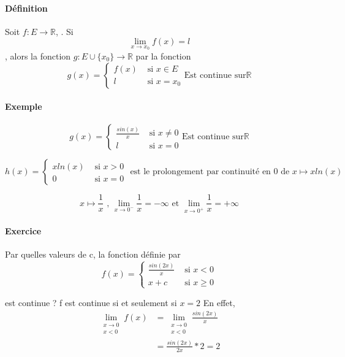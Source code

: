 \paragraph{Définition} Soit $f:E \rightarrow \mathbb{R}$, .
Si \[\lim_{x\to x_0} f(x) = l\], alors la fonction $g:E\cup \{x_0\} \rightarrow \mathbb{R}$ par la fonction ~\\
	\[g(x) = \left\{
			\begin{array}{rl}
				f(x)& \text{ si } x \in  E \\
				l&\text{ si } x = x_0
			\end{array}
			\right. \text{Est continue sur} \mathbb{R}
		\]

\paragraph{Exemple} 

\[g(x) =
	\left\{
			\begin{array}{rl}
				\frac{sin(x)}{x} & \text{ si } x \neq 0 \\
				l&\text{ si } x = 0
			\end{array}
			\right. \text{Est continue sur} \mathbb{R}
		\]

\[h(x) =
	\left\{
			\begin{array}{rl}
				xln(x) & \text{ si } x > 0 \\
				0&\text{ si } x = 0
			\end{array}
			\right. \text { est le prolongement par continuité en 0 de } x\mapsto xln(x)
		\]

		\[x \mapsto \frac{1}{x} \text{ , } \lim_{x \to 0^-} \frac{1}{x} = -\infty \text{ et }
			\lim_{x \to 0^+} \frac{1}{x} = +\infty \]

\paragraph{Exercice} Par quelles valeurs de c, la fonction définie par 
\[f(x) =
	\left\{
			\begin{array}{rl}
				\frac{sin(2x)}{x} & \text{ si } x < 0 \\
				x+c&\text{ si } x \geq 0
			\end{array}
			\right.
		\]

		est continue ? f est continue si et seulement si $x=2$ En effet, \begin{align*} 
		\lim_{\substack{x\to 0 \\ x < 0}} f(x) &= \lim_{\substack{x\to 0 \\ x <0}} \frac{sin(2x)}{x} \\
									  &= \frac{sin(2x)}{2x} * 2 = 2
		\end{align*}

